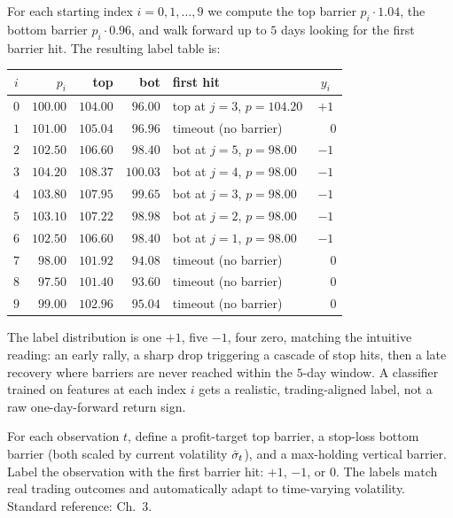 For each starting index $i = 0, 1, \ldots, 9$ we compute the top
barrier $p_i \cdot 1.04$, the bottom barrier $p_i \cdot 0.96$,
and walk forward up to $5$ days looking for the first barrier
hit. The resulting label table is:

\begin{center}
\begin{tabular}{c|rrr|l|c}
\toprule
$i$ & $p_i$ & top & bot & first hit & $y_i$ \\
\midrule
$0$ & $100.00$ & $104.00$ & $96.00$ & top at $j=3$, $p=104.20$ & $+1$ \\
$1$ & $101.00$ & $105.04$ & $96.96$ & timeout (no barrier) & $\phantom{+}0$ \\
$2$ & $102.50$ & $106.60$ & $98.40$ & bot at $j=5$, $p=98.00$ & $-1$ \\
$3$ & $104.20$ & $108.37$ & $100.03$ & bot at $j=4$, $p=98.00$ & $-1$ \\
$4$ & $103.80$ & $107.95$ & $99.65$ & bot at $j=3$, $p=98.00$ & $-1$ \\
$5$ & $103.10$ & $107.22$ & $98.98$ & bot at $j=2$, $p=98.00$ & $-1$ \\
$6$ & $102.50$ & $106.60$ & $98.40$ & bot at $j=1$, $p=98.00$ & $-1$ \\
$7$ & $\phantom{0}98.00$ & $101.92$ & $94.08$ & timeout (no barrier) & $\phantom{+}0$ \\
$8$ & $\phantom{0}97.50$ & $101.40$ & $93.60$ & timeout (no barrier) & $\phantom{+}0$ \\
$9$ & $\phantom{0}99.00$ & $102.96$ & $95.04$ & timeout (no barrier) & $\phantom{+}0$ \\
\bottomrule
\end{tabular}
\end{center}

The label distribution is one $+1$, five $-1$, four zero, matching
the intuitive reading: an early rally, a sharp drop triggering a
cascade of stop hits, then a late recovery where barriers are never
reached within the $5$-day window. A classifier trained on features
at each index $i$ gets a realistic, trading-aligned label, not a
raw one-day-forward return sign.

\begin{keyfactbox}
For each observation $t$, define a profit-target top barrier, a
stop-loss bottom barrier (both scaled by current volatility
$\hat{\sigma}_t$), and a max-holding vertical barrier. Label the
observation with the first barrier hit: $+1$, $-1$, or $0$. The
labels match real trading outcomes and automatically adapt to
time-varying volatility. Standard reference:
\citeAFML{} Ch.~3.
\end{keyfactbox}

